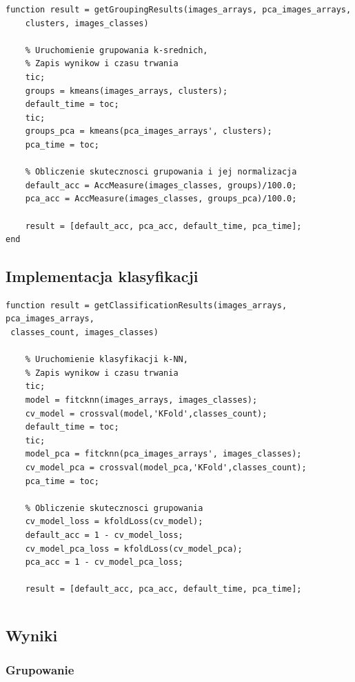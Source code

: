 \begin{lstlisting}[linewidth=16.0cm]
function result = getGroupingResults(images_arrays, pca_images_arrays, 
	clusters, images_classes)
	
	% Uruchomienie grupowania k-srednich,
	% Zapis wynikow i czasu trwania
	tic;
	groups = kmeans(images_arrays, clusters);
	default_time = toc;
	tic;
	groups_pca = kmeans(pca_images_arrays', clusters);
	pca_time = toc;
	
	% Obliczenie skutecznosci grupowania i jej normalizacja
	default_acc = AccMeasure(images_classes, groups)/100.0;
	pca_acc = AccMeasure(images_classes, groups_pca)/100.0;
	
	result = [default_acc, pca_acc, default_time, pca_time];
end
\end{lstlisting}

\subsection{Implementacja klasyfikacji}

\begin{lstlisting}[linewidth=16.0cm]
function result = getClassificationResults(images_arrays, pca_images_arrays,
 classes_count, images_classes)

	% Uruchomienie klasyfikacji k-NN,
	% Zapis wynikow i czasu trwania
	tic;
	model = fitcknn(images_arrays, images_classes);
	cv_model = crossval(model,'KFold',classes_count);
	default_time = toc;
	tic;
	model_pca = fitcknn(pca_images_arrays', images_classes);
	cv_model_pca = crossval(model_pca,'KFold',classes_count);
	pca_time = toc;
	
	% Obliczenie skutecznosci grupowania
	cv_model_loss = kfoldLoss(cv_model);
	default_acc = 1 - cv_model_loss;
	cv_model_pca_loss = kfoldLoss(cv_model_pca);
	pca_acc = 1 - cv_model_pca_loss;
	
	result = [default_acc, pca_acc, default_time, pca_time];
\end{lstlisting}



\begin{lstlisting}[linewidth=16.0cm]

\end{lstlisting}

\subsection{Wyniki}

\subsubsection{Grupowanie}

